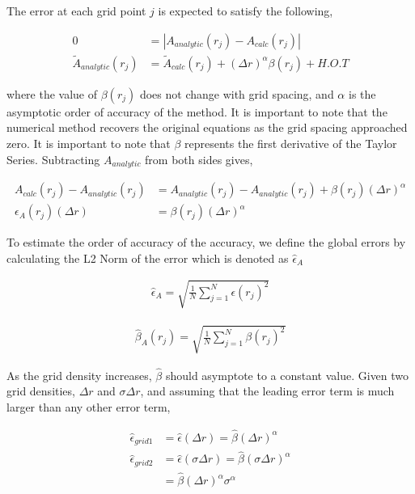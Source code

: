 The error at each grid point $j$ is expected to satisfy the following,

\begin{align*}
    0 &= |A_{analytic}(r_j) - A_{calc}(r_j)| \\
    \widetilde{A}_{analytic}(r_j) &= \widetilde{A}_{calc}(r_j) +
    (\Delta r)^{\alpha} \beta(r_j)  + H.O.T
\end{align*}

where the value of $\beta(r_j)$ does not change with grid spacing, and 
$\alpha$ is the asymptotic order of accuracy of the method. It is important to
note that the numerical method recovers the original equations as the grid 
spacing approached zero.  It is important to note that $\beta$ represents the
first derivative of the Taylor Series.  Subtracting $A_{analytic}$ from both
sides gives,

\begin{align*}
    A_{calc}(r_j) - A_{analytic}(r_j) &= A_{analytic}(r_j) - A_{analytic}(r_j)
    + \beta(r_j) (\Delta r)^{\alpha} \\
    \epsilon_A(r_j)(\Delta r) &= \beta(r_j) (\Delta r)^{\alpha}
\end{align*}

To estimate the order of accuracy of the accuracy, we define the global errors 
by calculating the L2 Norm of the error which is denoted as $\hat{\epsilon}_A$ 

\begin{align*}
    \hat{\epsilon}_A = \sqrt{\frac{1}{N}\sum_{j=1}^{N} \epsilon(r_j)^2  }
\end{align*}

\begin{align*}
    \hat{\beta}_A(r_j) = \sqrt{\frac{1}{N}\sum_{j=1}^{N} \beta(r_j)^2  }
\end{align*}

As the grid density increases, $\hat{\beta}$ should asymptote to a constant 
value. Given two grid densities, $\Delta r$ and $\sigma\Delta r$, and assuming
that the leading error term is much larger than any other error term,

\begin{align*}
    \hat{\epsilon}_{grid 1} &= \hat{\epsilon}(\Delta r) = \hat{\beta}(\Delta r)^{\alpha} \\
    \hat{\epsilon}_{grid 2} &= \hat{\epsilon}(\sigma \Delta r) = \hat{\beta}(\sigma \Delta r)^{\alpha} \\
                            &= \hat{\beta}(\Delta r)^{\alpha} \sigma^{\alpha}
\end{align*}

